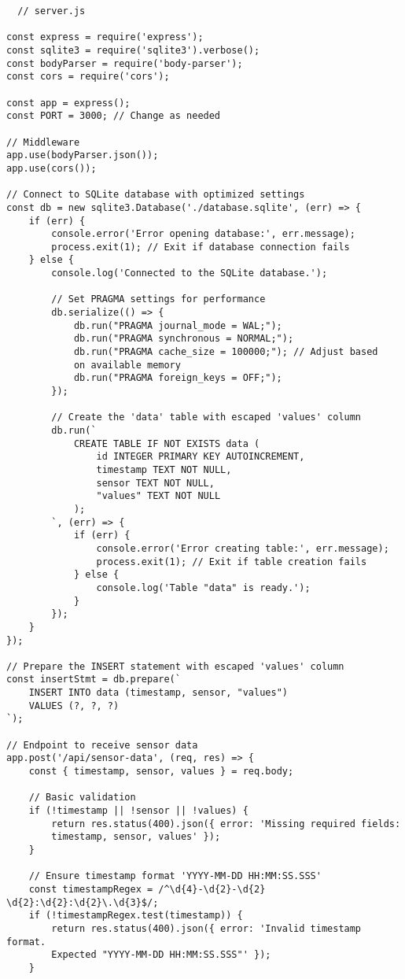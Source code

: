 \begin{verbatim}
  // server.js

const express = require('express');
const sqlite3 = require('sqlite3').verbose();
const bodyParser = require('body-parser');
const cors = require('cors');

const app = express();
const PORT = 3000; // Change as needed

// Middleware
app.use(bodyParser.json());
app.use(cors());

// Connect to SQLite database with optimized settings
const db = new sqlite3.Database('./database.sqlite', (err) => {
    if (err) {
        console.error('Error opening database:', err.message);
        process.exit(1); // Exit if database connection fails
    } else {
        console.log('Connected to the SQLite database.');

        // Set PRAGMA settings for performance
        db.serialize(() => {
            db.run("PRAGMA journal_mode = WAL;");
            db.run("PRAGMA synchronous = NORMAL;");
            db.run("PRAGMA cache_size = 100000;"); // Adjust based 
            on available memory
            db.run("PRAGMA foreign_keys = OFF;");
        });

        // Create the 'data' table with escaped 'values' column
        db.run(`
            CREATE TABLE IF NOT EXISTS data (
                id INTEGER PRIMARY KEY AUTOINCREMENT,
                timestamp TEXT NOT NULL,
                sensor TEXT NOT NULL,
                "values" TEXT NOT NULL
            );
        `, (err) => {
            if (err) {
                console.error('Error creating table:', err.message);
                process.exit(1); // Exit if table creation fails
            } else {
                console.log('Table "data" is ready.');
            }
        });
    }
});

// Prepare the INSERT statement with escaped 'values' column
const insertStmt = db.prepare(`
    INSERT INTO data (timestamp, sensor, "values")
    VALUES (?, ?, ?)
`);

// Endpoint to receive sensor data
app.post('/api/sensor-data', (req, res) => {
    const { timestamp, sensor, values } = req.body;

    // Basic validation
    if (!timestamp || !sensor || !values) {
        return res.status(400).json({ error: 'Missing required fields: 
        timestamp, sensor, values' });
    }

    // Ensure timestamp format 'YYYY-MM-DD HH:MM:SS.SSS'
    const timestampRegex = /^\d{4}-\d{2}-\d{2} \d{2}:\d{2}:\d{2}\.\d{3}$/;
    if (!timestampRegex.test(timestamp)) {
        return res.status(400).json({ error: 'Invalid timestamp format. 
        Expected "YYYY-MM-DD HH:MM:SS.SSS"' });
    }


\end{verbatim}
